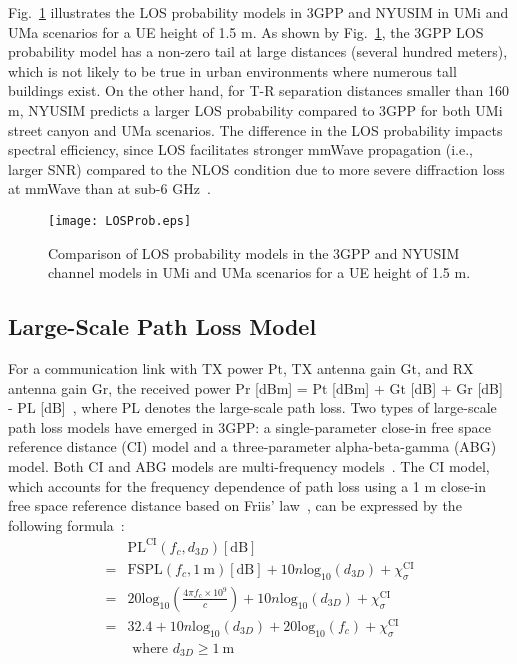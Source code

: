 \documentclass[journal]{IEEEtran}
\def\PL{\mathrm{PL}}
\def\dB{\mathrm{dB}}
\def\log{\mathrm{log}}
\def\PL{\mathrm{PL}}
\def\dB{\mathrm{dB}}
\def\FSPL{\mathrm{FSPL}}
\def\log{\mathrm{log}}
\def\CI{\mathrm{CI}}
\def\Pr{\mathrm{Pr}}
\def\m{\mathrm{m}}
\def\Pr{\mathrm{Pr}}
\def\Pt{\mathrm{Pt}}
\def\Gr{\mathrm{Gr}}
\def\Gt{\mathrm{Gt}}
\begin{document}
Fig.~\ref{fig:LOSProb} illustrates the LOS probability models in 3GPP and NYUSIM in UMi and UMa scenarios for a UE height of 1.5 m. As shown by Fig.~\ref{fig:LOSProb}, the 3GPP LOS probability model has a non-zero tail at large distances (several hundred meters), which is not likely to be true in urban environments where numerous tall buildings exist. On the other hand, for T-R separation distances smaller than 160 m, NYUSIM predicts a larger LOS probability compared to 3GPP for both UMi street canyon and UMa scenarios. The difference in the LOS probability impacts spectral efficiency, since LOS facilitates stronger mmWave propagation (i.e., larger SNR) compared to the NLOS condition due to more severe diffraction loss at mmWave than at sub-6 GHz~\cite{Deng16_Diff}. 
\begin{figure}
	\centering
	\texttt{[image: LOSProb.eps]}
	\caption{Comparison of LOS probability models in the 3GPP and NYUSIM channel models in UMi and UMa scenarios for a UE height of 1.5 m.}
	\label{fig:LOSProb}
\end{figure}

\subsection{Large-Scale Path Loss Model}
For a communication link with TX power $\Pt$, TX antenna gain $\Gt$, and RX antenna gain $\Gr$, the received power $\Pr$ [dBm] = $\Pt$ [dBm] + $\Gt$ [dB] + $\Gr$ [dB] - $\PL$ [dB]~\cite{Rap15}, where $\PL$ denotes the large-scale path loss. Two types of large-scale path loss models have emerged in 3GPP: a single-parameter close-in free space reference distance (CI) model and a three-parameter alpha-beta-gamma (ABG) model. Both CI and ABG models are multi-frequency models~\cite{Sun16:TVT}. The CI model, which accounts for the frequency dependence of path loss using a 1 m close-in free space reference distance based on Friis' law~\cite{Friis46a,Andersen95}, can be expressed by the following formula~\cite{Sun16:TVT}:
\begin{equation}\label{CI1}
\begin{split}
&\PL^{\CI}(f_c,d_{3D})[\dB]\\
=&\FSPL(f_c, 1~\m)[\dB]+10n\log_{10}\left(d_{3D}\right)+\chi_{\sigma}^{\CI} \\
=&20\log_{10}\left(\frac{4\pi f_c\times 10^9}{c}\right)+10n\log_{10}\left(d_{3D}\right)+\chi_{\sigma}^{\CI} \\
=&32.4+10n\log_{10}\left(d_{3D}\right)+20\log_{10}(f_c)+\chi_{\sigma}^{\CI}\\
&\text{ where } d_{3D}\geq 1~\m
\end{split}
\end{equation}
\end{document}
